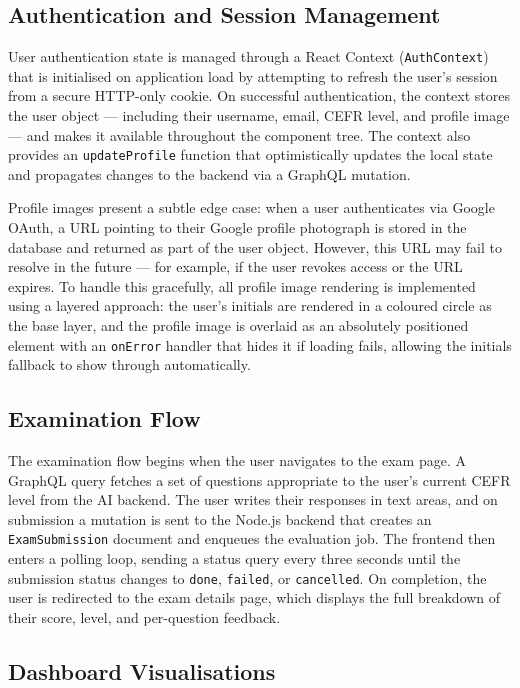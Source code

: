 \documentclass[12pt, a4paper]{report}
\begin{document}
\subsection{Authentication and Session Management}

User authentication state is managed through a React Context (\texttt{AuthContext}) that is initialised on application load by attempting to refresh the user's session from a secure HTTP-only cookie. On successful authentication, the context stores the user object — including their username, email, CEFR level, and profile image — and makes it available throughout the component tree. The context also provides an \texttt{updateProfile} function that optimistically updates the local state and propagates changes to the backend via a GraphQL mutation.

Profile images present a subtle edge case: when a user authenticates via Google OAuth, a URL pointing to their Google profile photograph is stored in the database and returned as part of the user object. However, this URL may fail to resolve in the future — for example, if the user revokes access or the URL expires. To handle this gracefully, all profile image rendering is implemented using a layered approach: the user's initials are rendered in a coloured circle as the base layer, and the profile image is overlaid as an absolutely positioned element with an \texttt{onError} handler that hides it if loading fails, allowing the initials fallback to show through automatically.

\subsection{Examination Flow}

The examination flow begins when the user navigates to the exam page. A GraphQL query fetches a set of questions appropriate to the user's current CEFR level from the AI backend. The user writes their responses in text areas, and on submission a mutation is sent to the Node.js backend that creates an \texttt{ExamSubmission} document and enqueues the evaluation job. The frontend then enters a polling loop, sending a status query every three seconds until the submission status changes to \texttt{done}, \texttt{failed}, or \texttt{cancelled}. On completion, the user is redirected to the exam details page, which displays the full breakdown of their score, level, and per-question feedback.

\subsection{Dashboard Visualisations}
\end{document}

